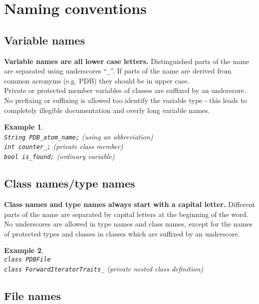\documentclass[a4]{article}
\newtheorem{example}{Example}
\begin{document}
\section{Naming conventions}



\subsection{Variable names}

{\bf Variable names are all lower case letters.} Distinguished parts of the name are
separated using underscores ``{\tt \_}''. If parts of the name are derived
from common acronyms (e.g. PDB) they should be in upper case.\\
Private or protected member variables of classes are suffixed by an
underscore.\\
No prefixing or suffixing is allowed too identify the variable type - this
leads to completely illegible documentation and overly long variable names.\\
\begin{example}\hspace*{2mm}\\
{\tt String PDB\_atom\_name;} (using an abbreviation)\\
{\tt int counter\_;} (private class member)\\
{\tt bool is\_found;} (ordinary variable)
\end{example}

\subsection{Class names/type names}

{\bf Class names and type names always start with a capital letter.} Different parts
of the name are separated by capital letters at the beginning of the word. No
underscores are allowed in type names and class names, except for the names of
protected types and classes in classes which are suffixed by an underscore.
\begin{example}\hspace*{2mm}\\
{\tt class PDBFile}\\
{\tt class ForwardIteratorTraits\_} (private nested class definition)\\
\end{example}

\subsection{File names}
\end{document}
